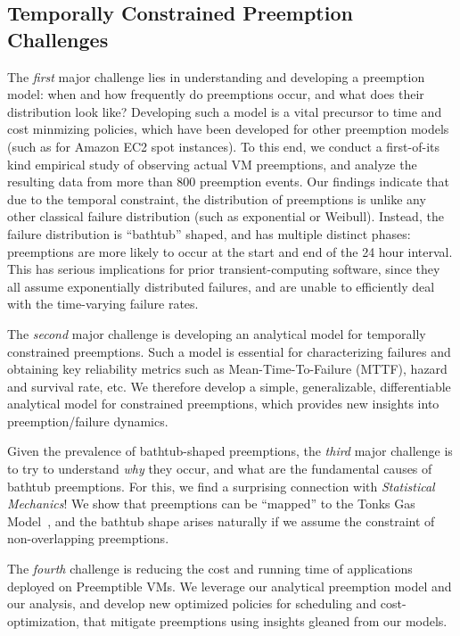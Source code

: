 \subsection{Temporally Constrained Preemption Challenges}

The \emph{first} major challenge lies in understanding and developing a preemption model: when and how frequently do preemptions occur, and what does their distribution look like?
Developing such a model is a vital precursor to time and cost minmizing policies, which have been developed for other preemption models (such as for Amazon EC2 spot instances).
To this end, we conduct a first-of-its kind empirical study of observing actual VM preemptions, and analyze the resulting data from more than 800 preemption events.
Our findings indicate that due to the temporal constraint, the distribution of preemptions is unlike any other classical failure distribution (such as exponential or Weibull).
Instead, the failure distribution is ``bathtub'' shaped, and has multiple distinct phases: preemptions are more likely to occur at the start and end of the 24 hour interval. 
This has serious implications for prior transient-computing software, since they all assume exponentially distributed failures, and are unable to efficiently deal with the time-varying failure rates.

The \emph{second} major challenge is developing an analytical model for temporally constrained preemptions.
Such a model is essential for characterizing failures and obtaining key reliability metrics such as Mean-Time-To-Failure (MTTF), hazard and survival rate, etc.
We therefore develop a simple, generalizable, differentiable analytical model for constrained preemptions, which provides new insights into preemption/failure dynamics.

Given the prevalence of bathtub-shaped preemptions, the \emph{third} major challenge is to try to understand \emph{why} they occur, and what are the fundamental causes of bathtub preemptions.
For this, we find a surprising connection with \emph{Statistical Mechanics}!
We show that preemptions can be ``mapped'' to the Tonks Gas Model~\cite{}, and the bathtub shape arises naturally if we assume the constraint of non-overlapping preemptions. 

The \emph{fourth} challenge is reducing the cost and running time of applications deployed on Preemptible VMs.
We leverage our analytical preemption model and our analysis, and develop new optimized policies for scheduling and cost-optimization, that mitigate preemptions using insights gleaned from our models.


